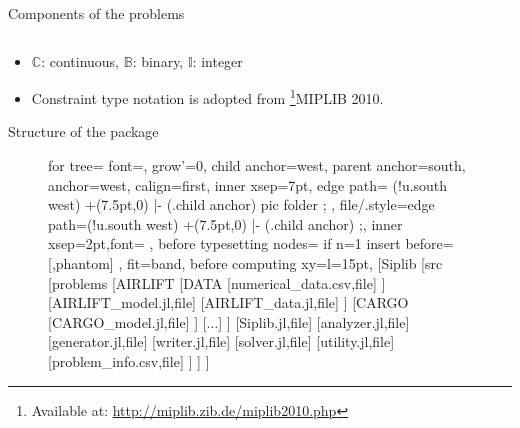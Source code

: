 \documentclass{beamer}
\newcommand{\miplib}{\textsf{MIPLIB 2010}}
\newcommand{\julia}{\texttt{Julia}}
\begin{document}
\begin{frame}{Components of the problems}
\begin{table}[H]
\begin{threeparttable}
\begin{tabular}{@{}lllll@{}}
				\end{tabular}
			\end{threeparttable}
		\end{table}
		\vspace{-0.5cm}
		\begin{itemize}
			\item $\mathbb{C}$: continuous, $\mathbb{B}$: binary, $\mathbb{I}$: integer
			\item Constraint type notation is adopted from \footnote{\tiny Available at: \href{http://miplib.zib.de/miplib2010.php}{http://miplib.zib.de/miplib2010.php}}{\miplib}.
		\end{itemize}
	\end{frame}
	
	\begin{frame}[shrink=45]{Structure of the package}
		\vspace{1cm}
		\begin{minipage}[c][1.3\paperheight][c]{\textwidth}
			\begin{figure} 
				\begin{forest}
					for tree={
						font=\ttfamily,
						grow'=0,
						child anchor=west,
						parent anchor=south,
						anchor=west,
						calign=first,
						inner xsep=7pt,
						edge path={
							\noexpand{}
							(!u.south west) +(7.5pt,0) |- (.child anchor) pic {folder} ;
						},
						file/.style={edge path={\noexpand{}
								(!u.south west) +(7.5pt,0) |- (.child anchor) ;},
							inner xsep=2pt,font=\small\ttfamily
						},
						before typesetting nodes={
							if n=1
							{insert before={[,phantom]}}
							{}
						},
						fit=band,
						before computing xy={l=15pt},
					}  
					[Siplib
					[src
					[problems
					[AIRLIFT
					[DATA
					[numerical\_data.csv,file]
					]
					[AIRLIFT\_model.jl,file]
					[AIRLIFT\_data.jl,file]
					]
					[CARGO
					[CARGO\_model.jl,file]			
					]
					[$\ldots$]
					]
					[Siplib.jl,file]
					[analyzer.jl,file]
					[generator.jl,file]
					[writer.jl,file]
					[solver.jl,file]
					[utility.jl,file]
					[problem\_info.csv,file]
					]
					]
					]
				\end{forest}
			\end{figure}
		\end{minipage} 
	\end{frame}
\end{document}
